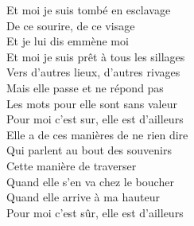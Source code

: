 \documentclass{novel}
\begin{document}
{\begin{minipage}[b][0.55\textheight][t]{\textwidth}
\begin{multicols}{2}
Et moi je suis tombé en esclavage \\
De ce sourire, de ce visage \\
Et je lui dis emmène moi \\
Et moi je suis prêt à tous les sillages \\
Vers d'autres lieux, d'autres rivages \\
Mais elle passe et ne répond pas \\
Les mots pour elle sont sans valeur \\
Pour moi c’est sur, elle est d’ailleurs \\

Elle a de ces manières de ne rien dire \\
Qui parlent au bout des souvenirs \\
Cette manière de traverser \\
Quand elle s'en va chez le boucher \\
Quand elle arrive à ma hauteur \\
Pour moi c'est sûr, elle est d'ailleurs \\

\end{multicols}
\end{minipage}
}
\newpage
\normalsize
\end{document}
